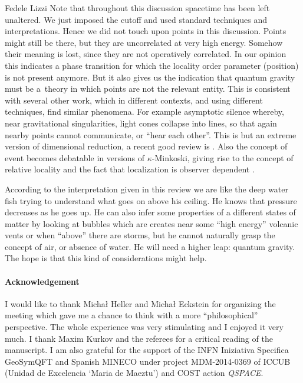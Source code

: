 \begin{artengenv}{Fedele Lizzi}
Note that throughout this discussion spacetime has been left unaltered. We just imposed the cutoff and used standard techniques and interpretations. Hence we did not touch upon points in this discussion.  Points might still be there, but they are uncorrelated at very high energy. Somehow their meaning is lost, since they are not operatively correlated. In our opinion this indicates a phase transition for which the locality order parameter (position) is not present anymore.
 But it also gives us the indication that quantum gravity must be a~theory in which points are not the relevant entity.
This is consistent with several other work, which in different contexts, and using different techniques, find similar phenomena. For example asymptotic silence whereby, near gravitational singularities, light cones collapse into lines, so that again nearby points cannot communicate, or ``hear each other''.  This is but an extreme version of dimensional reduction, a recent good review is \parencite{Carlip}. Also the concept of event becomes debatable in versions of $\kappa$-Minkoski, giving rise to the concept of relative locality \parencite{relaloc} and the fact that localization is observer dependent \parencite{LMM}.





According to the interpretation given in this review we are like the deep water fish trying to understand what goes on above his ceiling.
He knows that pressure decreases as he goes up. He can also infer some properties of a different states of matter by looking at bubbles which are creates near some ``high energy'' volcanic vents or when ``above'' there are storms, but he cannot naturally grasp the concept of air, or absence of water.
He will need a higher leap: quantum gravity. The hope is that this kind of considerations might help.

\paragraph{Acknowledgement}
I would like to thank Micha\l{} Heller and Micha\l{} Eckstein for organizing the meeting which gave me a chance to think with a more ``philosophical'' perspective. The whole experience was very stimulating and I enjoyed it very much. I thank Maxim Kurkov and the referees for a critical reading of the manuscript.
I am also grateful for the support of the INFN Iniziativa Specifica GeoSymQFT and Spanish
MINECO under project MDM-2014-0369 of ICCUB (Unidad de Excelencia `Maria de Maeztu') and  COST action \emph{QSPACE}.



\end{artengenv}

  
